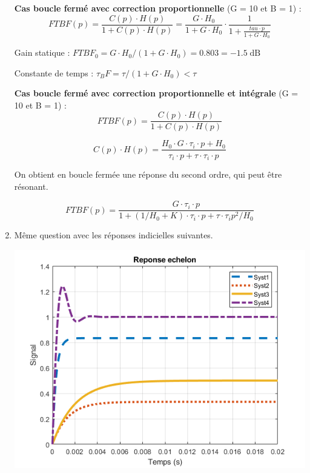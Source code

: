 \begin{enumerate}
{	\textbf{Cas boucle fermé avec correction proportionnelle} (G = 10 et B = 1) : 
	$$FTBF(p) = \frac{C(p) \cdot H(p)}{1 + C(p) \cdot  H(p)} = \frac{G \cdot H_0}{1 + G \cdot H_0} \cdot \frac{1}{1 + \frac{tau \cdot p}{1 + G \cdot H_0}}$$	
	
	Gain statique : $FTBF_0 = G \cdot H_0 / (1 + G \cdot H_0) = 0.803 = -1.5\operatorname{dB}$
	
	Constante de temps : $\tau_BF = \tau / (1 + G \cdot H_0) < \tau$
	

	\textbf{Cas boucle fermé avec correction proportionnelle et intégrale} (G = 10 et B = 1) : 
	$$FTBF(p) = \frac{C(p) \cdot H(p)}{1 + C(p) \cdot  H(p)}$$	
	
	$$C(p) \cdot  H(p) = \frac{H_0 \cdot G \cdot \tau_i \cdot p + H_0}{\tau_i \cdot p + \tau \cdot \tau_i \cdot p}$$

	On obtient en boucle fermée une réponse du second ordre, qui peut être résonant.
	
	$$FTBF(p) = \frac{G \cdot \tau_i \cdot p}{1 + (1/H_0 + K) \cdot \tau_i \cdot p + \tau \cdot \tau_i p^2 / H_0}$$	
}

	\item Même question avec les réponses indicielles suivantes.

\begin{center}
	\includegraphics[width=15cm]{images/TD/sys_boucle_step.png}
\end{center}


\end{enumerate}
